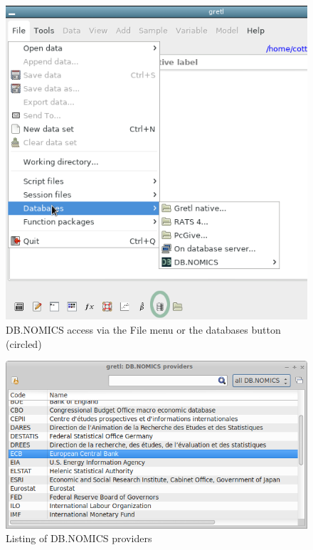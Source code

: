 \documentclass{article}
\begin{document}
\begin{figure}[htbp]
  \centering
  \includegraphics[scale=2.0]{db-access-1}
  \caption{DB.NOMICS access via the File menu or the databases
    button (circled)}
  \label{fig:db-access-1}
\end{figure}

\begin{figure}[htbp]
  \centering
  \includegraphics[scale=0.5]{db-access-2}
  \caption{Listing of DB.NOMICS providers}
  \label{fig:db-access-2}
\end{figure}
\end{document}
